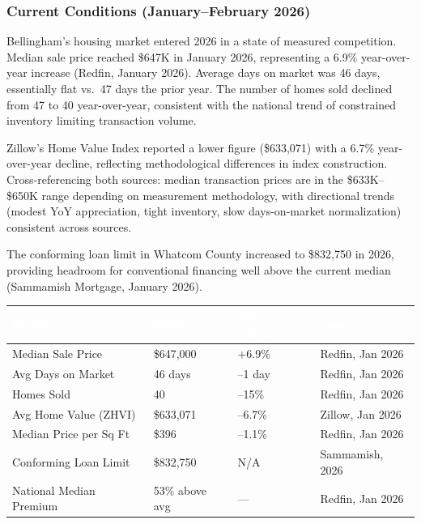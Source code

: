 \documentclass[11pt,letterpaper]{article}
\newcommand{\tableheader}[1]{\textbf{\sffamily\textcolor{white}{#1}}}
\begin{document}
\subsubsection{Current Conditions (January--February 2026)}

Bellingham's housing market entered 2026 in a state of measured competition. Median sale price reached \$647K in January 2026, representing a 6.9\% year-over-year increase (Redfin, January 2026). Average days on market was 46 days, essentially flat vs.\ 47 days the prior year. The number of homes sold declined from 47 to 40 year-over-year, consistent with the national trend of constrained inventory limiting transaction volume.

Zillow's Home Value Index reported a lower figure (\$633,071) with a 6.7\% year-over-year decline, reflecting methodological differences in index construction. Cross-referencing both sources: median transaction prices are in the \$633K--\$650K range depending on measurement methodology, with directional trends (modest YoY appreciation, tight inventory, slow days-on-market normalization) consistent across sources.

The conforming loan limit in Whatcom County increased to \$832,750 in 2026, providing headroom for conventional financing well above the current median (Sammamish Mortgage, January 2026).

\begin{center}
\begin{tabularx}{\textwidth}{L{4cm}C{3cm}C{3cm}L{3cm}}
\toprule
{}
\tableheader{Metric} & \tableheader{Value} & \tableheader{YoY Change} & \tableheader{Source} \\
\midrule
Median Sale Price & \$647,000 & +6.9\% & Redfin, Jan 2026 \\
Avg Days on Market & 46 days & --1 day & Redfin, Jan 2026 \\
Homes Sold & 40 & --15\% & Redfin, Jan 2026 \\
Avg Home Value (ZHVI) & \$633,071 & --6.7\% & Zillow, Jan 2026 \\
Median Price per Sq Ft & \$396 & --1.1\% & Redfin, Jan 2026 \\
Conforming Loan Limit & \$832,750 & N/A & Sammamish, 2026 \\
National Median Premium & 53\% above avg & --- & Redfin, Jan 2026 \\
\bottomrule
\end{tabularx}
\end{center}
\end{document}
